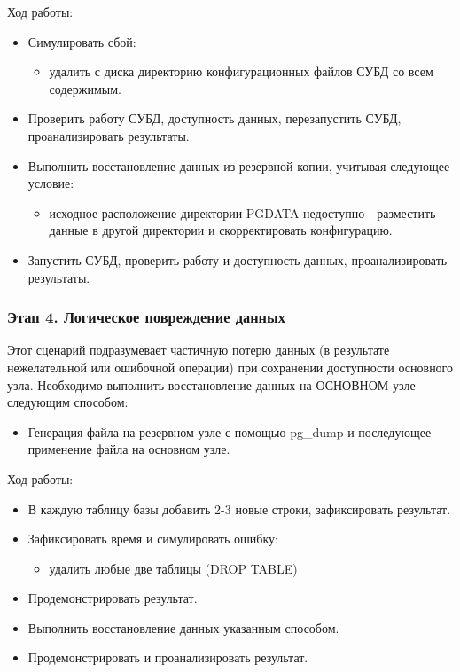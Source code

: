 \documentclass{article}
\begin{document}
Ход работы:
    \begin{itemize}
        \item Симулировать сбой:
            \begin{itemize}
                \item удалить с диска директорию конфигурационных файлов СУБД со всем содержимым.
            \end{itemize}
        \item Проверить работу СУБД, доступность данных, перезапустить СУБД, проанализировать результаты.
        \item Выполнить восстановление данных из резервной копии, учитывая следующее условие:
            \begin{itemize}
                \item исходное расположение директории PGDATA недоступно - разместить данные в другой директории и скорректировать конфигурацию.
            \end{itemize}
        \item Запустить СУБД, проверить работу и доступность данных, проанализировать результаты.
    \end{itemize}
\subsubsection{Этап 4. Логическое повреждение данных}
Этот сценарий подразумевает частичную потерю данных (в результате нежелательной или ошибочной операции) при сохранении доступности основного узла. Необходимо выполнить восстановление данных на ОСНОВНОМ узле следующим способом:
    \begin{itemize}
        \item Генерация файла на резервном узле с помощью pg\_dump и последующее применение файла на основном узле.
    \end{itemize}
Ход работы:
\begin{itemize}
    \item В каждую таблицу базы добавить 2-3 новые строки, зафиксировать результат.
    \item Зафиксировать время и симулировать ошибку:
        \begin{itemize}
            \item удалить любые две таблицы (DROP TABLE)
        \end{itemize}
    \item Продемонстрировать результат.
    \item Выполнить восстановление данных указанным способом.
    \item Продемонстрировать и проанализировать результат.
\end{itemize}
\end{document}
